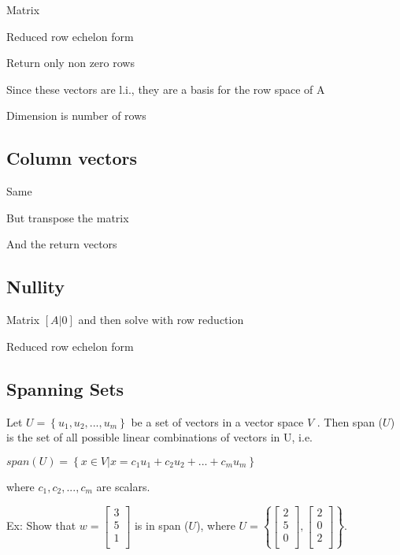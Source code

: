 \documentclass{extarticle}
\begin{document}
\begin{multicols}{2}
Matrix

Reduced row echelon form

Return only non zero rows

Since these vectors are l.i., they are a basis for the row space of A

Dimension is number of rows




\subsection{Column vectors}

Same

But transpose the matrix

And the return vectors



\subsection{Nullity}

Matrix $[A|0]$
and then solve with row reduction

Reduced row echelon form








\begin{tcolorbox}[enhanced jigsaw,sharp corners,coltext=black,colback=BurntOrange!25!white,boxrule=0pt,breakable,size=minimal]

\subsection{Spanning Sets}
Let $U = \left\{u_1,u_2,...,u_m\right\}$ be a set of vectors in a vector space $V$ . Then span ($U$) is the set of all possible linear combinations of vectors in U, i.e.

$span (U) = \left\{x \in V | x = c_1u_1 + c_2u_2 + ... + c_mu_m \right\}$

where $c_1, c_2,...,c_m$ are scalars.

Ex: Show that $w = \left[ \begin{matrix}3\\5\\1\\\end{matrix} \right]$ is in span ($U$), where $U = \left\{ \left[ \begin{matrix}2\\5\\0\\\end{matrix}\right], \left[ \begin{matrix}2\\0\\2\\\end{matrix}\right] \right\} $.


\end{tcolorbox}
\end{multicols}
\end{document}
